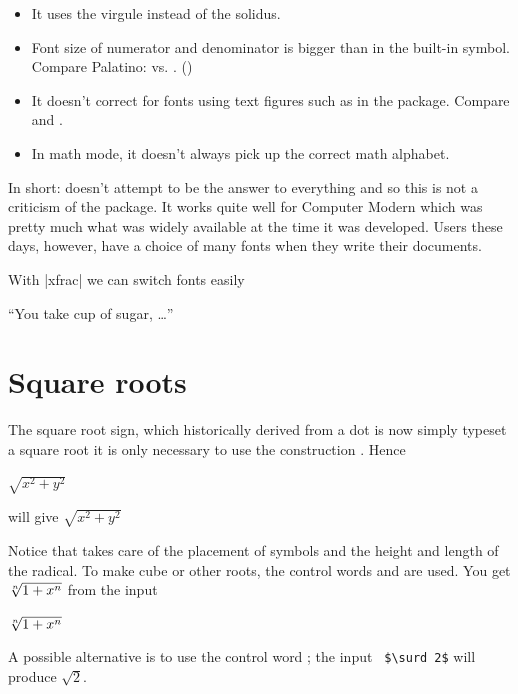  \begin{itemize}
  \item It uses the virgule instead of the solidus.
  \item Font size of numerator and denominator is bigger than in the
    built-in symbol. Compare Palatino: 
    vs. . ()

  \item It doesn't correct for fonts using text figures such as in the
     package. Compare  and
    .
  \item In math mode, it doesn't always pick up the correct math
    alphabet.
 \end{itemize}
 In short:  doesn't attempt to be the answer to
 everything and so this is not a criticism of the package. It works
 quite well for Computer Modern which was pretty much what was widely
 available at the time it was developed. Users these days, however,
 have a choice of many fonts when they write their documents.

With |xfrac| we can switch fonts easily

 ``You take  cup of sugar, \ldots''




\section{Square roots}

The square root sign, which historically derived from a dot is now simply typeset a square root it is only necessary to use the construction . Hence

\begin{teX}
$\sqrt{x^2+y^2}$
\end{teX}

will give $\sqrt{x^2+y^2}$


Notice that \tex takes care of the placement of
symbols and the height and length of the radical. To make cube or other roots, the control
words  and  are used. You get $\root n \of {1+x^n}$ from the input 

\begin{teX}
   $\root n \of  {1+x^n}$ 
\end{teX}

A possible alternative is to use the control word ; the input \verb+ $\surd 2$+ will
produce $\surd 2$.

